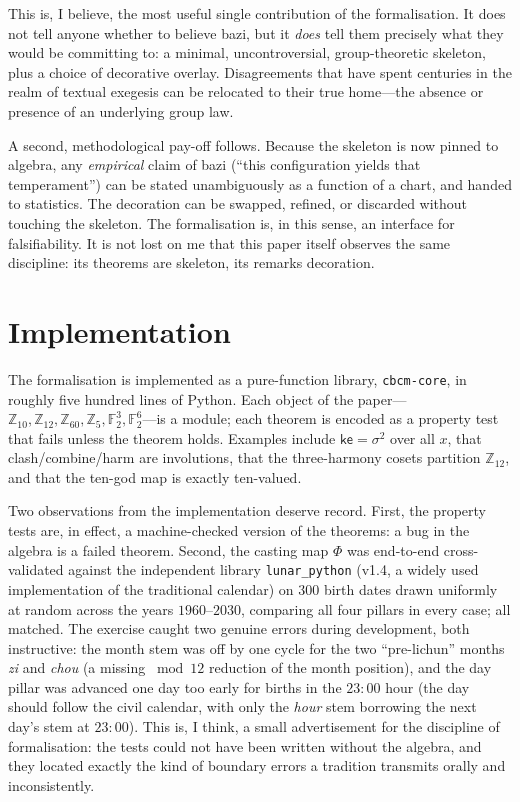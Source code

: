 \documentclass[11pt,a4paper]{article}
\theoremstyle{definition}
\theoremstyle{remark}
\newcommand{\Z}{\mathbb{Z}}
\newcommand{\F}{\mathbb{F}}
\newcommand{\ke}{\mathsf{ke}}
\begin{document}
This is, I believe, the most useful single contribution of the formalisation. It does not tell anyone whether to believe bazi, but it \emph{does} tell them precisely what they would be committing to: a minimal, uncontroversial, group-theoretic skeleton, plus a choice of decorative overlay. Disagreements that have spent centuries in the realm of textual exegesis can be relocated to their true home---the absence or presence of an underlying group law.

A second, methodological pay-off follows. Because the skeleton is now pinned to algebra, any \emph{empirical} claim of bazi (``this configuration yields that temperament'') can be stated unambiguously as a function of a chart, and handed to statistics. The decoration can be swapped, refined, or discarded without touching the skeleton. The formalisation is, in this sense, an interface for falsifiability. It is not lost on me that this paper itself observes the same discipline: its theorems are skeleton, its remarks decoration.

\section{Implementation}\label{sec:impl}
The formalisation is implemented as a pure-function library, \texttt{cbcm-core}, in roughly five hundred lines of Python. Each object of the paper---$\Z_{10},\Z_{12},\Z_{60},\Z_5,\F_2^3,\F_2^6$---is a module; each theorem is encoded as a property test that fails unless the theorem holds. Examples include $\ke=\sigma^2$ over all $x$, that clash/combine/harm are involutions, that the three-harmony cosets partition $\Z_{12}$, and that the ten-god map is exactly ten-valued.

Two observations from the implementation deserve record. First, the property tests are, in effect, a machine-checked version of the theorems: a bug in the algebra is a failed theorem. Second, the casting map $\Phi$ was end-to-end cross-validated against the independent library \texttt{lunar\_python} (v1.4, a widely used implementation of the traditional calendar) on $300$ birth dates drawn uniformly at random across the years $1960$--$2030$, comparing all four pillars in every case; all matched. The exercise caught two genuine errors during development, both instructive: the month stem was off by one cycle for the two ``pre-lichun'' months \emph{zi} and \emph{chou} (a missing $\bmod 12$ reduction of the month position), and the day pillar was advanced one day too early for births in the $23{:}00$ hour (the day should follow the civil calendar, with only the \emph{hour} stem borrowing the next day's stem at $23{:}00$). This is, I think, a small advertisement for the discipline of formalisation: the tests could not have been written without the algebra, and they located exactly the kind of boundary errors a tradition transmits orally and inconsistently.
\end{document}
